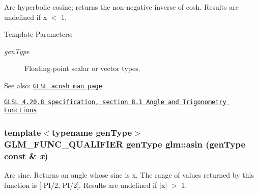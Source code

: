 Arc hyperbolic cosine; returns the non-negative inverse of cosh. Results are undefined if x $<$ 1.

\begin{Desc}
\item[Template Parameters:]
\begin{description}
\item[{\em genType}]Floating-point scalar or vector types.\end{description}
\end{Desc}
\begin{Desc}
\item[See also:]\href{http://www.opengl.org/sdk/docs/manglsl/xhtml/acosh.xml}{\tt GLSL acosh man page} 

\href{http://www.opengl.org/registry/doc/GLSLangSpec.4.20.8.pdf}{\tt GLSL 4.20.8 specification, section 8.1 Angle and Trigonometry Functions} \end{Desc}
\hypertarget{group__core__func__trigonometric_gb87756fced3e8d3f58b24b65c8166b77}{
\subsubsection[asin]{\setlength{\rightskip}{0pt plus 5cm}template$<$typename genType$>$ GLM\_\-FUNC\_\-QUALIFIER genType glm::asin (genType const \& {\em x})}}
\label{group__core__func__trigonometric_gb87756fced3e8d3f58b24b65c8166b77}


Arc sine. Returns an angle whose sine is x. The range of values returned by this function is \mbox{[}-PI/2, PI/2\mbox{]}. Results are undefined if $|$x$|$ $>$ 1.

